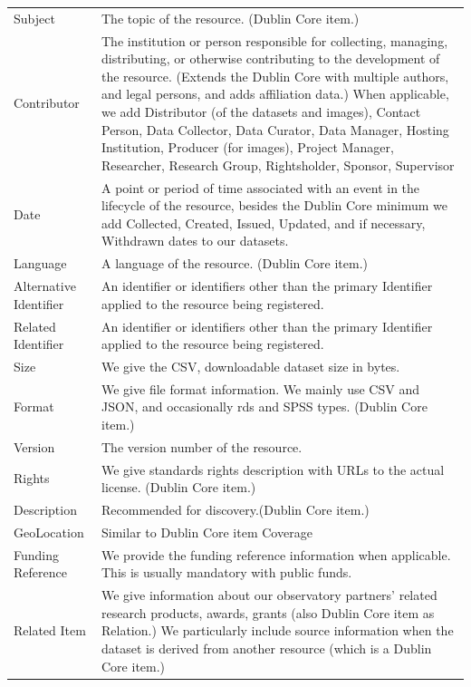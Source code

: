 \documentclass[
  a4paper,
  openany, a4paper, oneside]{book}
\begin{document}
\begin{longtable}[]{@{}
  >{\raggedright\arraybackslash}p{}
  >{\centering\arraybackslash}p{}@{}}
\toprule
& \\
\midrule
\endhead
Subject & The topic of the resource. (Dublin Core item.) \\
Contributor & The institution or person responsible for collecting, managing, distributing, or otherwise contributing to the development of the resource. (Extends the Dublin Core with multiple authors, and legal persons, and adds affiliation data.) When applicable, we add Distributor (of the datasets and images), Contact Person, Data Collector, Data Curator, Data Manager, Hosting Institution, Producer (for images), Project Manager, Researcher, Research Group, Rightsholder, Sponsor, Supervisor \\
Date & A point or period of time associated with an event in the lifecycle of the resource, besides the Dublin Core minimum we add Collected, Created, Issued, Updated, and if necessary, Withdrawn dates to our datasets. \\
Language & A language of the resource. (Dublin Core item.) \\
Alternative Identifier & An identifier or identifiers other than the primary Identifier applied to the resource being registered. \\
Related Identifier & An identifier or identifiers other than the primary Identifier applied to the resource being registered. \\
Size & We give the CSV, downloadable dataset size in bytes. \\
Format & We give file format information. We mainly use CSV and JSON, and occasionally rds and SPSS types. (Dublin Core item.) \\
Version & The version number of the resource. \\
Rights & We give standards rights description with URLs to the actual license. (Dublin Core item.) \\
Description & Recommended for discovery.(Dublin Core item.) \\
GeoLocation & Similar to Dublin Core item Coverage \\
Funding Reference & We provide the funding reference information when applicable. This is usually mandatory with public funds. \\
Related Item & We give information about our observatory partners' related research products, awards, grants (also Dublin Core item as Relation.) We particularly include source information when the dataset is derived from another resource (which is a Dublin Core item.) \\
\bottomrule
\end{longtable}
\end{document}

